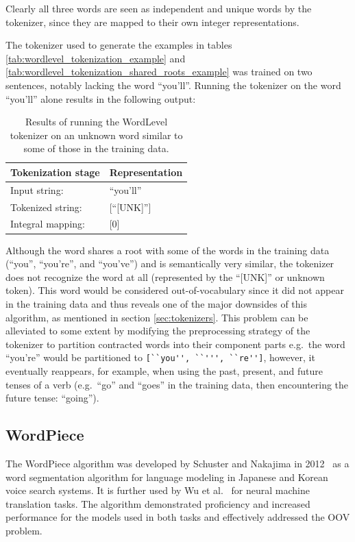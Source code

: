 \documentclass[12pt]{article}
\begin{document}
\noindent
Clearly all three words are seen as independent and unique words by the tokenizer, since they are mapped to their own integer representations.

The tokenizer used to generate the examples in tables \ref{tab:wordlevel_tokenization_example} and
\ref{tab:wordlevel_tokenization_shared_roots_example} was trained on two sentences, notably lacking the word ``you'll''. Running the tokenizer on the
word ``you'll'' alone results in the following output:

\begin{table}[h!]
    \centering
    \begin{tabular}{l l}
        \toprule
        Tokenization stage & Representation \\
        \midrule
        Input string:      & ``you'll''     \\
        Tokenized string:  & [``[UNK]'']    \\
        Integral mapping:  & [0]            \\
        \bottomrule
    \end{tabular}
    \caption{Results of running the WordLevel tokenizer on an unknown word similar to some of those in the training data.}
    \label{tab:wordlevel_unk_word}
\end{table}

\noindent
Although the word shares a root with some of the words in the training data (``you'', ``you're'', and ``you've'') and is semantically very similar,
the tokenizer does not recognize the word at all (represented by the ``[UNK]'' or unknown token). This word would be considered out-of-vocabulary
since it did not appear in the training data and thus reveals one of the major downsides of this algorithm, as mentioned in section
\ref{sec:tokenizers}. This problem can be alleviated to some extent by modifying the preprocessing strategy of the tokenizer to partition contracted
words into their component parts e.g.~the word ``you're'' would be partitioned to \lstinline|[``you'', ``''', ``re'']|, however, it eventually
reappears, for example, when using the past, present, and future tenses of a verb (e.g.~``go'' and ``goes'' in the training data, then encountering
the future tense: ``going'').

\subsection{WordPiece}\label{sec:wordpiece}
The WordPiece algorithm was developed by Schuster and Nakajima in 2012~\cite{schuster_japanese_2012} as a word segmentation algorithm for language
modeling in Japanese and Korean voice search systems. It is further used by Wu et al.~\cite{wu_googles_2016} for neural machine translation tasks. The
algorithm demonstrated proficiency and increased performance for the models used in both tasks and effectively addressed the OOV problem.
\end{document}
